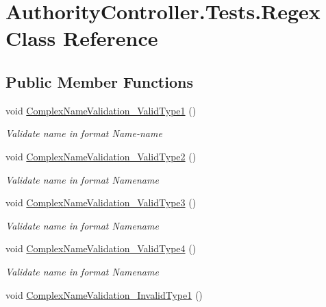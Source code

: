 \hypertarget{class_authority_controller_1_1_tests_1_1_regex}{}\section{Authority\+Controller.\+Tests.\+Regex Class Reference}
\label{class_authority_controller_1_1_tests_1_1_regex}
\subsection*{Public Member Functions}
\begin{DoxyCompactItemize}
\item 
void \mbox{\hyperlink{class_authority_controller_1_1_tests_1_1_regex_a1cd8672005a3920c7e732faa90e7c277}{Complex\+Name\+Validation\+\_\+\+Valid\+Type1}} ()
\begin{DoxyCompactList}\small\item\em Validate name in format Name-\/name \end{DoxyCompactList}\item 
void \mbox{\hyperlink{class_authority_controller_1_1_tests_1_1_regex_ab708f31285d07735bed81112f9b99dbb}{Complex\+Name\+Validation\+\_\+\+Valid\+Type2}} ()
\begin{DoxyCompactList}\small\item\em Validate name in format Name\textquotesingle{}name \end{DoxyCompactList}\item 
void \mbox{\hyperlink{class_authority_controller_1_1_tests_1_1_regex_af0e2f15b85228c222e93f2e072f9c4cc}{Complex\+Name\+Validation\+\_\+\+Valid\+Type3}} ()
\begin{DoxyCompactList}\small\item\em Validate name in format Name\textquotesingle{}name \end{DoxyCompactList}\item 
void \mbox{\hyperlink{class_authority_controller_1_1_tests_1_1_regex_af58498eae51d6a356d0e5b980258919e}{Complex\+Name\+Validation\+\_\+\+Valid\+Type4}} ()
\begin{DoxyCompactList}\small\item\em Validate name in format Name\textquotesingle{}name \end{DoxyCompactList}\item 
void \mbox{\hyperlink{class_authority_controller_1_1_tests_1_1_regex_a879692bffbbf9c13c7c6f400d6b38707}{Complex\+Name\+Validation\+\_\+\+Invalid\+Type1}} ()

\end{DoxyCompactItemize}
